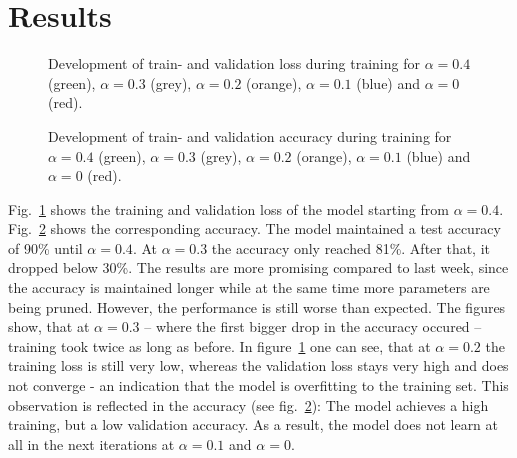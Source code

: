 \documentclass[10pt,twocolumn,letterpaper]{article}
\begin{document}
\section{Results}
\begin{figure}[hpbt]
	\centering
	\hspace{0.1\textwidth}
	\caption[]{Development of train- and validation loss during training for $\alpha=0.4$ (green), $\alpha=0.3$ (grey), $\alpha=0.2$ (orange), $\alpha=0.1$ (blue) and $\alpha=0$ (red).}
	\label{fig:loss}
\end{figure}
\begin{figure}[hpbt]
	\centering
	\hspace{0.1\textwidth}
	\caption[]{Development of train- and validation accuracy during training for $\alpha=0.4$ (green), $\alpha=0.3$ (grey), $\alpha=0.2$ (orange), $\alpha=0.1$ (blue) and $\alpha=0$ (red).}
	\label{fig:acc}
\end{figure}
Fig.~\ref{fig:loss} shows the training and validation loss of the model starting from $\alpha=0.4$.
Fig.~\ref{fig:acc} shows the corresponding accuracy.
The model maintained a test accuracy of 90\% until $\alpha=0.4$.
At $\alpha=0.3$ the accuracy only reached 81\%.
After that, it dropped below 30\%.
The results are more promising compared to last week, since the accuracy is maintained longer while at the same time more parameters are being pruned.
However, the performance is still worse than expected.
The figures show, that at $\alpha=0.3$ -- where the first bigger drop in the accuracy occured -- training took twice as long as before.
In figure~\ref{fig:loss} one can see, that at $\alpha=0.2$ the training loss is still very low, whereas the validation loss stays very high and does not converge - an indication that the model is overfitting to the training set.
This observation is reflected in the accuracy (see fig.~\ref{fig:acc}):
The model achieves a high training, but a low validation accuracy.
As a result, the model does not learn at all in the next iterations at $\alpha=0.1$ and $\alpha=0$.
\end{document}
